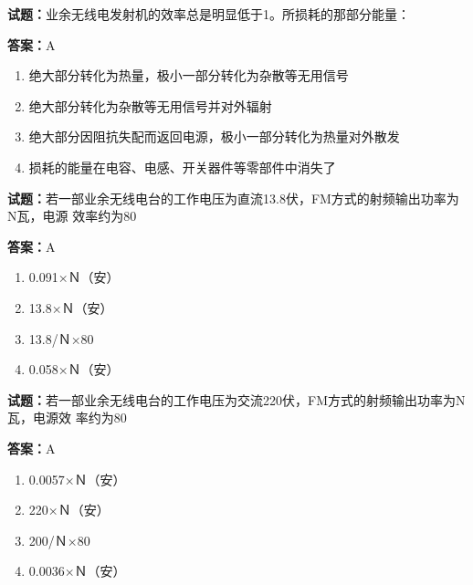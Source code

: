 \documentclass{ctexbook}
\begin{document}
\textbf{试题：}业余无线电发射机的效率总是明显低于1。所损耗的那部分能量： 

\textbf{答案：}A 

\begin{enumerate}[leftmargin=3em]
  \item 绝大部分转化为热量，极小一部分转化为杂散等无用信号 

  \item 绝大部分转化为杂散等无用信号并对外辐射 

  \item 绝大部分因阻抗失配而返回电源，极小一部分转化为热量对外散发 

  \item 损耗的能量在电容、电感、开关器件等零部件中消失了 

\end{enumerate}





\vspace{1em}

\textbf{试题：}若一部业余无线电台的工作电压为直流13.8伏，FM方式的射频输出功率为N瓦，电源
效率约为80%

\textbf{答案：}A 

\begin{enumerate}[leftmargin=3em]
  \item 0.091×Ｎ（安） 

  \item 13.8×Ｎ（安） 

  \item 13.8/Ｎ×80%

  \item 0.058×Ｎ（安） 

\end{enumerate}





\vspace{1em}

\textbf{试题：}若一部业余无线电台的工作电压为交流220伏，FM方式的射频输出功率为N瓦，电源效
率约为80%

\textbf{答案：}A 

\begin{enumerate}[leftmargin=3em]
  \item 0.0057×Ｎ（安） 

  \item 220×Ｎ（安） 

  \item 200/Ｎ×80%

  \item 0.0036×Ｎ（安） 

\end{enumerate}
\end{document}

